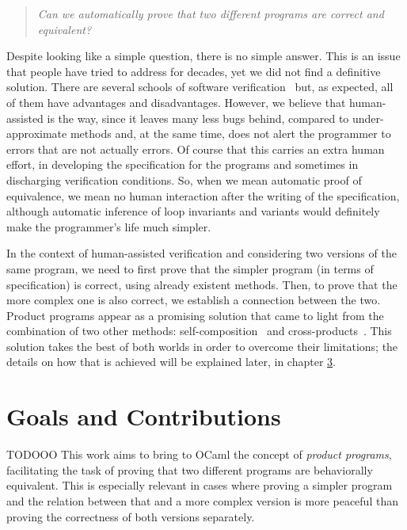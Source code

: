 \begin{quote}
    \centering
    \emph{Can we automatically prove that two different programs are correct and equivalent?}
\end{quote}

Despite looking like a simple question, there is no simple answer.
This is an issue that people have tried to address for decades, yet we did not find a definitive solution.
There are several schools of software verification~\cite{DBLP:conf/fm/BrainP24} but, as expected, all of them have advantages and disadvantages.
However, we believe that human-assisted is the way, since it leaves many less bugs behind, compared to under-approximate methods and, at the same time, does not alert the programmer to errors that are not actually errors.
Of course that this carries an extra human effort, in developing the specification for the programs and sometimes in discharging verification conditions.
So, when we mean automatic proof of equivalence, we mean no human interaction after the writing of the specification, although automatic inference of loop invariants and variants would definitely make the programmer's life much simpler.

In the context of human-assisted verification and considering two versions of the same program, we need to first prove that the simpler program (in terms of specification) is correct, using already existent methods.
Then, to prove that the more complex one is also correct, we establish a connection between the two.
Product programs appear as a promising solution that came to light from the combination of two other methods: self-composition~\cite{DBLP:conf/csfw/BartheDR04} and cross-products~\cite{DBLP:conf/fm/ZaksP08}.
This solution takes the best of both worlds in order to overcome their limitations; the details on how that is achieved will be explained later, in chapter \hyperref[cha:state_of_the_art]{3}.


\section{Goals and Contributions}


TODOOO
This work aims to bring to OCaml the concept of \emph{product programs}, facilitating the task of proving that two different programs are behaviorally equivalent.
This is especially relevant in cases where proving a simpler program and the relation between that and a more complex version is more peaceful than proving the correctness of both versions separately.


